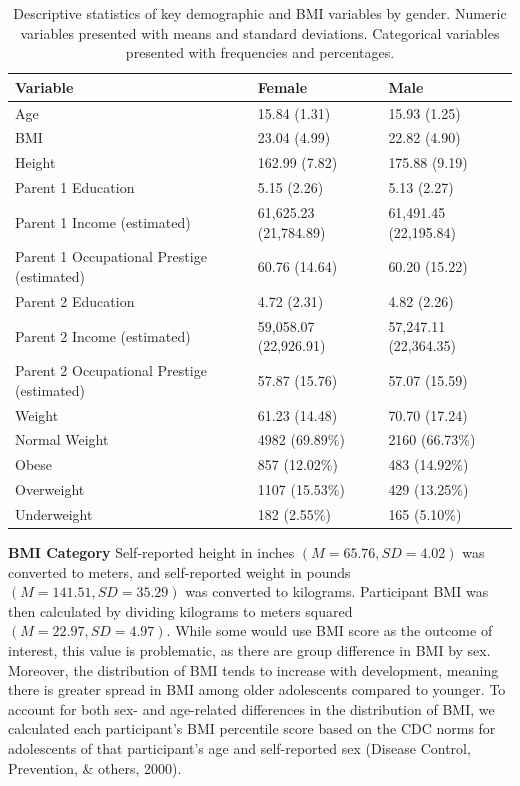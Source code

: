 \documentclass[man]{apa6}
\begin{document}
\begin{table}[tbp]
\begin{center}
\begin{threeparttable}
\caption{\label{tab:desc}Descriptive statistics of key demographic and BMI variables by gender. Numeric variables presented with means and standard deviations. Categorical variables presented with frequencies and percentages.}
\begin{tabular}{lll}
\toprule
Variable & Female & Male\\
\midrule
Age & 15.84 (1.31) & 15.93 (1.25)\\
BMI & 23.04 (4.99) & 22.82 (4.90)\\
Height & 162.99 (7.82) & 175.88 (9.19)\\
Parent 1 Education & 5.15 (2.26) & 5.13 (2.27)\\
Parent 1 Income (estimated) & 61,625.23 (21,784.89) & 61,491.45 (22,195.84)\\
Parent 1 Occupational Prestige (estimated) & 60.76 (14.64) & 60.20 (15.22)\\
Parent 2 Education & 4.72 (2.31) & 4.82 (2.26)\\
Parent 2 Income (estimated) & 59,058.07 (22,926.91) & 57,247.11 (22,364.35)\\
Parent 2 Occupational Prestige (estimated) & 57.87 (15.76) & 57.07 (15.59)\\
Weight & 61.23 (14.48) & 70.70 (17.24)\\
Normal Weight & 4982 (69.89\%) & 2160 (66.73\%)\\
Obese & 857 (12.02\%) & 483 (14.92\%)\\
Overweight & 1107 (15.53\%) & 429 (13.25\%)\\
Underweight & 182 (2.55\%) & 165 (5.10\%)\\
\bottomrule
\end{tabular}
\end{threeparttable}
\end{center}
\end{table}

\textbf{BMI Category} Self-reported height in inches \((M = 65.76, SD = 4.02)\) was converted to meters, and self-reported weight in pounds \((M = 141.51, SD = 35.29)\) was converted to kilograms. Participant BMI was then calculated by dividing kilograms to meters squared \((M = 22.97, SD = 4.97)\). While some would use BMI score as the outcome of interest, this value is problematic, as there are group difference in BMI by sex. Moreover, the distribution of BMI tends to increase with development, meaning there is greater spread in BMI among older adolescents compared to younger. To account for both sex- and age-related differences in the distribution of BMI, we calculated each participant's BMI percentile score based on the CDC norms for adolescents of that participant's age and self-reported sex (Disease Control, Prevention, \& others, 2000).
\end{document}
